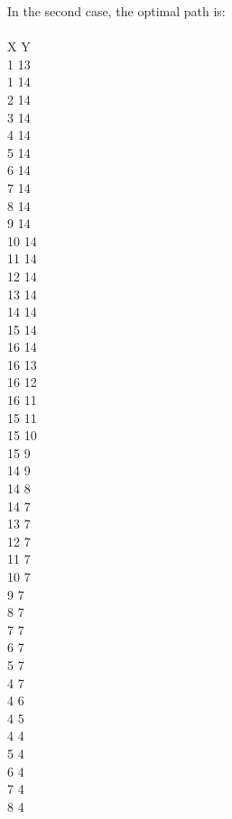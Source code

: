\documentclass[11pt,a4paper,oneside]{report}
\begin{document}
In the second case, the optimal path is:\\\\
X Y\\     
     1    13\\
     1    14\\
     2    14\\
     3    14\\
     4    14\\
     5    14\\
     6    14\\
     7    14\\
     8    14\\
     9    14\\
    10    14\\
    11    14\\
    12    14\\
    13    14\\
    14    14\\
    15    14\\
    16    14\\
    16    13\\
    16    12\\
    16    11\\
    15    11\\
    15    10\\
    15     9\\
    14     9\\
    14     8\\
    14     7\\
    13     7\\
    12     7\\
    11     7\\
    10     7\\
     9     7\\
     8     7\\
     7     7\\
     6     7\\
     5     7\\
     4     7\\
     4     6\\
     4     5\\
     4     4\\
     5     4\\
     6     4\\
     7     4\\
     8     4\\\\
     
\end{document}
